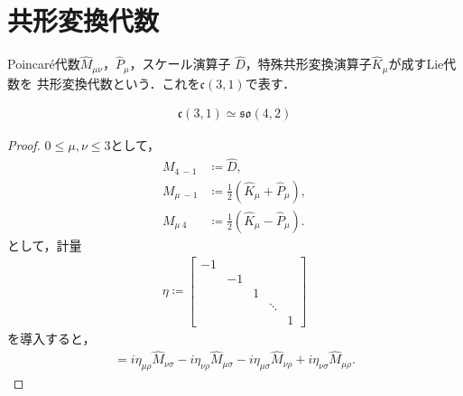\section{共形変換代数}
\begin{defn}[共形変換代数]
	Poincar\'{e}代数\(\hat{M}_{\mu\nu}\)，\(\hat{P}_{\mu}\)，スケール演算子
	\(\hat{D}\)，特殊共形変換演算子\(\hat{K}_{\mu}\)が成すLie代数を
	共形変換代数という．これを\(\mathfrak{c}(3,1)\)で表す．
\end{defn}
\begin{prop}
	\begin{align}
		\mathfrak{c}(3,1)\simeq{}\mathfrak{so}(4,2)
	\end{align}
\end{prop}
\begin{proof}
	\(0\leq{}\mu,\nu\leq{}3\)として，
	\begin{align}
		M_{4\ -1}   & \coloneqq{}\hat{D},                                  \\
		M_{\mu\ -1} & \coloneqq{}\frac{1}{2}(\hat{K}_{\mu}+\hat{P}_{\mu}), \\
		M_{\mu\ 4}  & \coloneqq{}\frac{1}{2}(\hat{K}_{\mu}-\hat{P}_{\mu}).
	\end{align}
	として，計量
	\begin{align}
		\eta\coloneqq{}\begin{bmatrix}
			-1 &                     \\
			   & -1 &                \\
			   &    & 1              \\
			   &    &   & \ddots     \\
			   &    &   &        & 1
		\end{bmatrix}
	\end{align}
	を導入すると，
	\begin{align}
		[\hat{M}_{\mu\nu},\hat{M}_{\rho\sigma}]=i\eta_{\mu\rho}\hat{M}_{\nu\sigma}-i\eta_{\nu\rho}\hat{M}_{\mu\sigma}-i\eta_{\mu\sigma}\hat{M}_{\nu\rho}+i\eta_{\nu\sigma}\hat{M}_{\mu\rho}.
	\end{align}
\end{proof}
